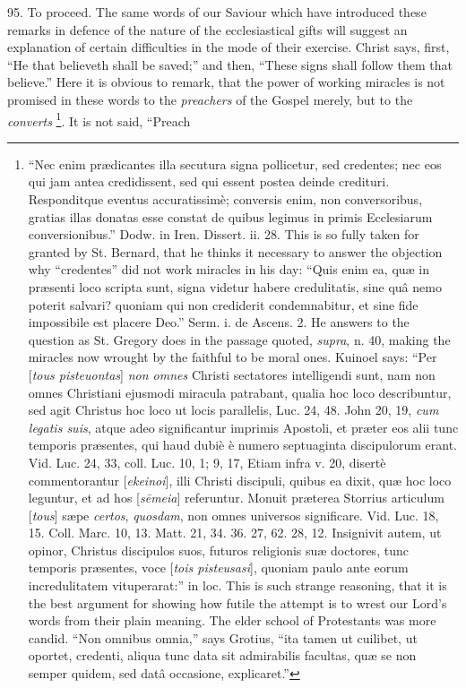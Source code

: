 95.
To proceed. The same words of our Saviour which have introduced these
remarks in defence of the nature of the ecclesiastical gifts will
suggest an explanation of certain difficulties in the mode of their
exercise. Christ says, first, ``He that believeth shall be saved;'' and
then, ``These signs shall follow them that believe.'' Here it is obvious
to remark, that the power of working miracles is not promised in these
words to the \emph{preachers} of the Gospel merely, but to the \emph{converts}
\footnote{``Nec enim prædicantes illa secutura signa pollicetur, sed credentes;
nec eos qui jam antea credidissent, sed qui essent postea deinde
credituri. Responditque eventus accuratissimè; conversis enim, non
conversoribus, gratias illas donatas esse constat de quibus legimus in
primis Ecclesiarum conversionibus.'' Dodw. in Iren. Dissert. ii. 28.
This is so fully taken for granted by St. Bernard, that he thinks it
necessary to answer the objection why ``credentes'' did not work
miracles in his day: ``Quis enim ea, quæ in præsenti loco scripta
sunt, signa videtur habere credulitatis, sine quâ nemo poterit
salvari? quoniam qui non crediderit condemnabitur, et sine fide
impossibile est placere Deo.'' Serm. i. de Ascens. 2. He answers to the
question as St. Gregory does in the passage quoted, \emph{supra}, n.
40, making the miracles now wrought by the faithful to be moral ones.
Kuinoel says: ``Per [\emph{tous pisteuontas}] \emph{non omnes} Christi
sectatores intelligendi sunt, nam non omnes Christiani ejusmodi
miracula patrabant, qualia hoc loco describuntur, sed agit Christus
hoc loco ut locis parallelis, Luc. 24, 48. John 20, 19, \emph{cum legatis
suis}, atque adeo significantur imprimis Apostoli, et præter eos
alii tunc temporis præsentes, qui haud dubiè è numero septuaginta
discipulorum erant. Vid. Luc. 24, 33, coll. Luc. 10, 1; 9, 17, Etiam
infra v. 20, disertè commentorantur [\emph{ekeinoi}], illi Christi
discipuli, quibus ea dixit, quæ hoc loco leguntur, et ad hos [\emph{s\={e}meia}]
referuntur. Monuit præterea Storrius articulum [\emph{tous}] sæpe \emph{certos},
\emph{quosdam}, non omnes universos significare. Vid. Luc. 18, 15.
Coll. Marc. 10, 13. Matt. 21, 34. 36. 27, 62. 28, 12. Insignivit autem,
ut opinor, Christus discipulos suos, futuros religionis suæ doctores,
tunc temporis præsentes, voce [\emph{tois pisteusasi}], quoniam paulo
ante eorum incredulitatem vituperarat:'' in loc. This is such strange
reasoning, that it is the best argument for showing how futile the
attempt is to wrest our Lord's words from their plain meaning. The
elder school of Protestants was more candid. ``Non omnibus omnia,'' says
Grotius, ``ita tamen ut cuilibet, ut oportet, credenti, aliqua tunc
data sit admirabilis facultas, quæ se non semper quidem, sed datâ
occasione, explicaret.''}. It is not said, ``Preach
